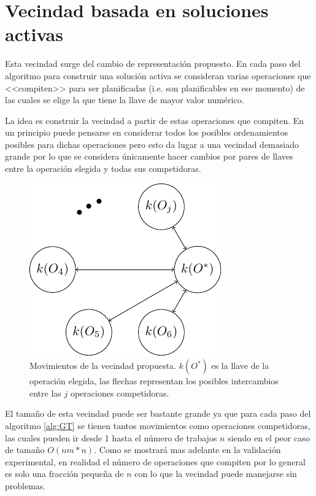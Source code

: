 \section{Vecindad basada en soluciones activas}
Esta vecindad surge del cambio de representación propuesto. En cada paso del algoritmo para construir una solución activa se consideran varias 
operaciones que <<compiten>> para ser planificadas (i.e. son planificables en ese momento) de las cuales se elige la que tiene la llave de mayor valor numérico. 

La idea es construir la vecindad a partir de estas operaciones que compiten. En un principio puede pensarse en considerar todos los posibles ordenamientos 
posibles para dichas operaciones pero esto da lugar a una vecindad demasiado grande por lo que se considera únicamente hacer cambios por pares de llaves 
entre la operación elegida y todas sus competidoras.

\begin{figure}[H]
\centering
\includegraphics[scale=1.3]{Imagenes/vec2.pdf}
\caption{Movimientos de la vecindad propuesta. $k(O^*)$ es la llave de la operación elegida, las flechas representan los posibles intercambios entre las $j$ operaciones competidoras.}
\end{figure}

El tamaño de esta vecindad puede ser bastante grande ya que para cada paso del algoritmo \ref{alg:GT} se tienen tantos movimientos como operaciones competidoras, 
las cuales pueden ir desde 1 hasta el número de trabajos $n$ siendo en el peor caso de tamaño $O(nm*n)$. 
%
Como se mostrará mas adelante en la validación experimental, en realidad el número de operaciones que compiten por lo general es solo una fracción pequeña de $n$ 
con lo que la vecindad puede manejarse sin problemas.


